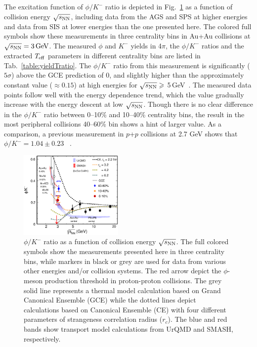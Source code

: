 \documentclass[%
 reprint,	
showpacs,
 amsmath,amssymb,
 aps,
 prc,
]{revtex4-1}
\begin{document}
The excitation function of $\phi/K^-$ ratio is depicted in Fig.~\ref{fig:phi2Kratio} as a function of collision energy $\sqrt{s_{\rm NN}}$, including data from the AGS and SPS at higher energies and data from SIS at lower energies than the one presented here. The colored full symbols show these measurements in three centrality bins in Au+Au collisions at ${\sqrt{s_{\rm NN}} = \rm{3\,GeV}}$. The measured $\phi$ and $K^-$ yields in 4$\pi$, the $\phi/K^-$ ratios and the extracted $T_{\rm eff}$ parameters in different centrality bins are listed
in Tab.~\ref{table:yieldTratio}. The $\phi/K^-$ ratio from this measurement is significantly ($5\sigma$) above the GCE prediction of 0, and slightly higher than the approximately constant value ($\approx0.15$) at high energies for $\sqrt{s_{\rm NN}}\geqslant$ 5\,GeV~\cite{NA49_phi,NA49_piK,NA49_piK2,E917_phi,ALICE_phi_2p7TeV,STAR_phi_64a200GeV}. The measured data points follow well with the energy dependence trend, which the value gradually increase with the energy descent at low $\sqrt{s_{\rm NN}}$. %
Though there is no clear difference in the $\phi/K^-$ ratio between 0--10\% and 10--40\% centrality bins, the result in the most peripheral collisions 40--60\% bin shows a hint of larger value. As a comparison, a previous measurement in $p$+$p$ collisions at 2.7 GeV shows that $\phi/K^- = 1.04\pm0.23$ ~\cite{ANKE_phi}.


\begin{figure}
\centering
\includegraphics[width=0.45\textwidth]{fig/fig4_phi_over_kminus_zoomin.eps}
  \caption{ $\phi/K^-$ ratio as a function of collision energy $\sqrt{s_{\rm NN}}$. The full colored symbols show the measurements presented here in three centrality bins, while markers in black or grey are used for data from various other energies and/or collision systems. The red arrow depict the $\phi$-meson production threshold in proton-proton collisions. The grey solid line represents a thermal model calculation based on Grand Canonical Ensemble (GCE) while the dotted lines depict calculations based on Canonical Ensemble (CE) with four different parameters of strangeness correlation radius ($r_c$). The blue and red bands show transport model calculations from UrQMD and SMASH, respectively.}
\label{fig:phi2Kratio} 
\end{figure}
\end{document}
